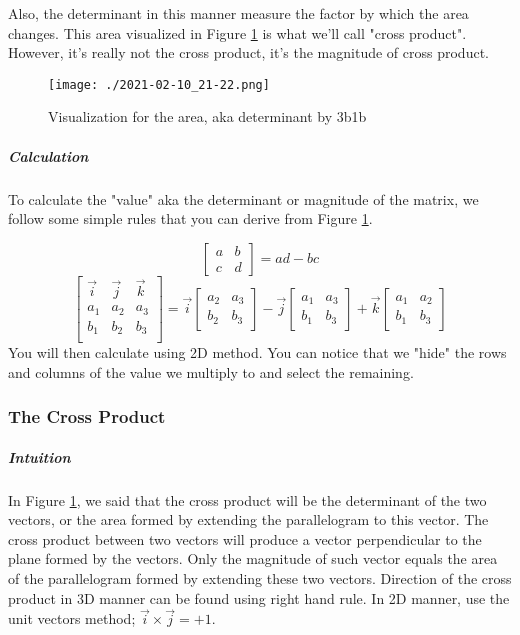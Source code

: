 \documentclass{article}
\begin{document}
	Also, the determinant in this manner measure the factor by which the area changes. This area visualized in Figure \ref{3b1b:det1} is what we'll call "cross product". However, it's really not the cross product, it's the magnitude of cross product.

	\begin{figure}[h]
		\texttt{[image: ./2021-02-10\_21-22.png]}
		\caption{Visualization for the area, aka determinant by 3b1b}
		\label{3b1b:det1}
	\end{figure}

	\subparagraph{Calculation}
	To calculate the "value" aka the determinant or magnitude of the matrix, we follow some simple rules that you can derive from Figure \ref{3b1b:det1}.

	\[
		\left [
			\begin{matrix}
				a & b\\c & d
			\end{matrix}
			\right]
		= a d - b c
	\]
	\[
		\left [
			\begin{matrix}
				\vec{ i } & \vec{ j } & \vec{ k } \\
				a_1 & a_2 & a_3 \\
				b_1 & b_2 & b_3 \\
			\end{matrix}
			\right] = \vec{ i } \left [
			\begin{matrix}
				a_2 & a_3\\
				b_2 & b_3
			\end{matrix}
			\right]
		- \vec{ j } \left [
			\begin{matrix}
				a_1 & a_3\\b_1 & b_3
			\end{matrix}
			\right] + \vec{ k } \left [
			\begin{matrix}
				a_1 & a_2\\b_1 & b_3
			\end{matrix}
			\right]
	\]
	You will then  calculate using 2D method. You can notice that we "hide" the rows and columns of the value we multiply to and select the remaining.

	\subsubsection{The Cross Product}

	\subparagraph{Intuition} 

	In Figure \ref{3b1b:det1}, we said that the cross product will be the determinant of the two vectors, or the area formed by extending the parallelogram to this vector. The cross product between two vectors will produce a vector perpendicular to the plane formed by the vectors. Only the magnitude of such vector equals the area of the parallelogram formed by extending these two vectors. 
	Direction of the cross product in 3D manner can be found using right hand rule. In 2D manner, use the unit vectors method; 
	$ \vec{ i } \times \vec{ j } = +1$.
\end{document}
